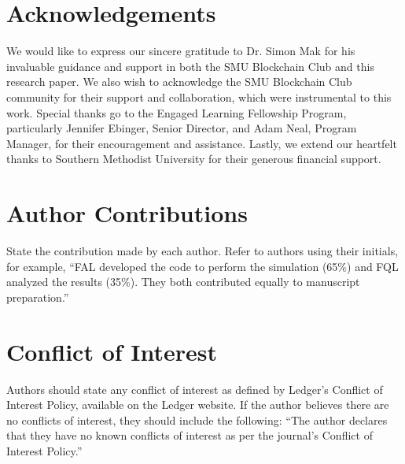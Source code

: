 \documentclass{ledger}
\begin{document}
\section*{Acknowledgements} 

We would like to express our sincere gratitude to Dr. Simon Mak for his invaluable guidance and support in both the SMU Blockchain Club and this research paper. We also wish to acknowledge the SMU Blockchain Club community for their support and collaboration, which were instrumental to this work. Special thanks go to the Engaged Learning Fellowship Program, particularly Jennifer Ebinger, Senior Director, and Adam Neal, Program Manager, for their encouragement and assistance. Lastly, we extend our heartfelt thanks to Southern Methodist University for their generous financial support.

\section*{Author Contributions}

State the contribution made by each author.  Refer to authors using their initials, for example, ``FAL developed the code to perform the simulation (65\%) and FQL analyzed the results (35\%).  They both contributed equally to manuscript preparation.''

\section*{Conflict of Interest}

Authors should state any conflict of interest as defined by Ledger's Conflict of Interest Policy, available on the Ledger website. If the author believes there are no conflicts of interest, they should include the following: ``The author declares that they have no known conflicts of interest as per the journal’s Conflict of Interest Policy.''







\newpage 	
\end{document}
